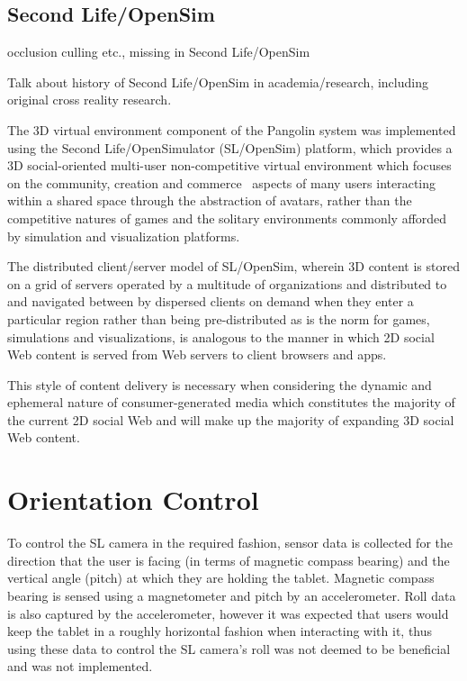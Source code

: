
\subsection{Second Life/OpenSim}

\cite{willmott:largecomplex} occlusion culling etc., missing in Second Life/OpenSim



Talk about history of Second Life/OpenSim in academia/research, including original cross reality research.

The 3D virtual environment component of the Pangolin system was implemented using the Second Life/OpenSimulator (SL/OpenSim) platform, which provides a 3D social-oriented multi-user non-competitive virtual environment which focuses on the community, creation and commerce~\cite{Sevan2008} aspects of many users interacting within a shared space through the abstraction of avatars, rather than the competitive natures of games and the solitary environments commonly afforded by simulation and visualization platforms.

The distributed client/server model of SL/OpenSim, wherein 3D content is stored on a grid of servers operated by a multitude of organizations and distributed to and navigated between by dispersed clients on demand when they enter a particular region rather than being pre-distributed as is the norm for games, simulations and visualizations, is analogous to the manner in which 2D social Web content is served from Web servers to client browsers and apps.

This style of content delivery is necessary when considering the dynamic and ephemeral nature of consumer-generated media which constitutes the majority of the current 2D social Web and will make up the majority of expanding 3D social Web content.


\section{Orientation Control}

To control the SL camera in the required fashion, sensor data is collected for the direction that the user is facing (in terms of magnetic compass bearing) and the vertical angle (pitch) at which they are holding the tablet. Magnetic compass bearing is sensed using a magnetometer and pitch by an accelerometer. Roll data is also captured by the accelerometer, however it was expected that users would keep the tablet in a roughly horizontal fashion when interacting with it, thus using these data to control the SL camera's roll was not deemed to be beneficial and was not implemented.

